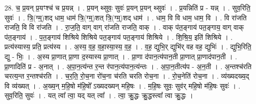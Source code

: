 \documentclass[17pt]{extarticle}
\begin{document}
28. च॒ प्र॒यन् प्र॒यꣳश्च॑ च प्र॒यन्न् । . प्र॒यन् थ्सुवः॒ सुवः॑ प्र॒यन् प्र॒यन् थ्सुवः॑ । . प्र॒यन्निति॑ प्र - यन्न् । . सुव॒रिति॒ सुवः॑ । . त्रि॒(ग्म्॒)शद् धाम॒ धाम॑ त्रि॒(ग्म्॒)शत् त्रि॒(ग्म्॒)शद् धाम॑ । . धाम॒ वि वि धाम॒ धाम॒ वि । . वि रा॑जति राजति॒ वि वि रा॑जति । . रा॒ज॒ति॒ वाग् वाग् रा॑जति राजति॒ वाक् । . वाक् प॑त॒ङ्गाय॑ पत॒ङ्गाय॒ वाग् वाक् प॑त॒ङ्गाय॑ । . प॒त॒ङ्गाय॑ शिश्रिये शिश्रिये पत॒ङ्गाय॑ पत॒ङ्गाय॑ शिश्रिये । . शि॒श्रि॒य॒ इति॑ शिश्रिये । . प्रत्य॑स्यास्य॒ प्रति॒ प्रत्य॑स्य । . अ॒स्य॒ व॒ह॒ व॒हा॒स्या॒स्य॒ व॒ह॒ । . व॒ह॒ द्युभि॒र् द्युभि॑र् वह वह॒ द्युभिः॑ । . द्युभि॒रिति॒ द्यु - भिः॒ । . अ॒स्य प्रा॒णात् प्रा॒णा द॒स्यास्य प्रा॒णात् । . प्रा॒णा द॑पान॒त्य॑पान॒ती प्रा॒णात् प्रा॒णाद॑पान॒ती । . प्रा॒णादिति॑ प्र - अ॒नात् । . अ॒पा॒न॒त्य॑न्त र॒न्त र॑पान॒त्य॑पान॒त्य॑न्तः । . अ॒पा॒न॒तीत्य॑प - अ॒न॒ती । . अ॒न्तश्च॑रति चरत्य॒न्त र॒न्तश्च॑रति । . च॒र॒ति॒ रो॒च॒ना रो॑च॒ना च॑रति चरति रोच॒ना । . रो॒च॒नेति॑ रोच॒ना । . व्य॑ख्यदख्य॒द् वि व्य॑ख्यत् । . अ॒ख्य॒न् म॒हि॒षो म॑हि॒षो᳚ ऽख्यदख्यन् महि॒षः । . म॒हि॒षः सुवः॒ सुव॑र् महि॒षो म॑हि॒षः सुवः॑ । . सुव॒रिति॒ सुवः॑ । . यत् त्वा᳚ त्वा॒ यद् यत् त्वा᳚ । . त्वा॒ क्रु॒द्धः क्रु॒द्धस्त्वा᳚ त्वा क्रु॒द्धः । \newline
\end{document}
